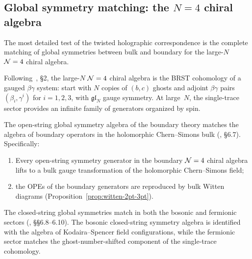 \subsection{Global symmetry matching: the \texorpdfstring{$N\!=\!4$}{N=4} chiral algebra}

The most detailed test of the twisted holographic correspondence is the
complete matching of global symmetries between bulk and boundary for the
large-$N$ $\N=4$ chiral algebra.

\begin{definition}[Large-$N$ $\N=4$ chiral algebra; \ClaimStatusProvedElsewhere]
Following~\cite{CG18}, \S2, the large-$N$ $\N=4$ chiral algebra is the
BRST cohomology of a gauged $\beta\gamma$ system: start with
$N$ copies of $(b,c)$ ghosts and adjoint $\beta\gamma$ pairs
$(\beta_i, \gamma^i)$ for $i = 1,2,3$, with $\mathfrak{gl}_N$ gauge
symmetry. At large~$N$, the single-trace sector provides an infinite
family of generators organized by spin.
\end{definition}

\begin{proposition}
The open-string global symmetry algebra of the boundary theory matches
the algebra of boundary operators in the holomorphic Chern--Simons bulk
\textup{(}\!\cite{CG18}, \S6.7\textup{)}. Specifically:
\begin{enumerate}[label=\textup{(\roman*)}]
\item Every open-string symmetry generator in the boundary $\N=4$
 chiral algebra lifts to a bulk gauge transformation of the
 holomorphic Chern--Simons field;
\item the OPEs of the boundary generators are reproduced by
 bulk Witten diagrams \textup{(}Proposition~\textup{\ref{prop:witten-2pt-3pt})}.
\end{enumerate}
\end{proposition}

\begin{proposition}
The closed-string global symmetries match in both the bosonic and
fermionic sectors \textup{(}\!\cite{CG18}, \S\S6.8--6.10\textup{)}.
The bosonic closed-string symmetry algebra is identified with the
algebra of Kodaira--Spencer field configurations, while the fermionic
sector matches the ghost-number-shifted component of the single-trace
cohomology.
\end{proposition}

